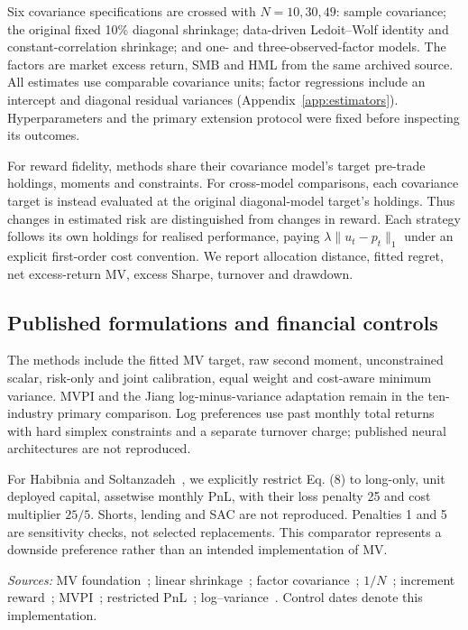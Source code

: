 \documentclass[sigconf,anonymous,review]{acmart}
\begin{document}
Six covariance specifications are crossed with $N=10,30,49$: sample covariance; the original fixed 10\% diagonal shrinkage; data-driven Ledoit--Wolf identity and constant-correlation shrinkage; and one- and three-observed-factor models. The factors are market excess return, SMB and HML from the same archived source. All estimates use comparable covariance units; factor regressions include an intercept and diagonal residual variances (Appendix~\ref{app:estimators}). Hyperparameters and the primary extension protocol were fixed before inspecting its outcomes.

For reward fidelity, methods share their covariance model's target pre-trade holdings, moments and constraints. For cross-model comparisons, each covariance target is instead evaluated at the original diagonal-model target's holdings. Thus changes in estimated risk are distinguished from changes in reward. Each strategy follows its own holdings for realised performance, paying $\lambda\|u_t-p_t\|_1$ under an explicit first-order cost convention. We report allocation distance, fitted regret, net excess-return MV, excess Sharpe, turnover and drawdown.

\subsection{Published formulations and financial controls}
The methods include the fitted MV target, raw second moment, unconstrained scalar, risk-only and joint calibration, equal weight and cost-aware minimum variance. MVPI and the Jiang log-minus-variance adaptation remain in the ten-industry primary comparison. Log preferences use past monthly total returns with hard simplex constraints and a separate turnover charge; published neural architectures are not reproduced.

For Habibnia and Soltanzadeh~\cite{habibnia2024}, we explicitly restrict Eq. (8) to long-only, unit deployed capital, assetwise monthly PnL, with their loss penalty 25 and cost multiplier $25/5$. Shorts, lending and SAC are not reproduced. Penalties 1 and 5 are sensitivity checks, not selected replacements. This comparator represents a downside preference rather than an intended implementation of MV.

\begin{table}[t]
\centering
\caption{Ten-industry comparison, 1990--2025. All distances and gaps here use the original fixed-diagonal MV reference at its common states. Covariance rows therefore measure a model change, not pure reward misalignment. Realised metrics use own-state paths. Published formulations are adapted, not complete algorithm replications; bold identifies our exact construction, not superior investment performance.}
\label{tab:historical}

\par\smallskip
\parbox{\textwidth}{\footnotesize\emph{Sources:} MV foundation~\cite{markowitz1952}; linear shrinkage~\cite{ledoit2004identity,ledoit2004correlation}; factor covariance~\cite{fan2008}; $1/N$~\cite{demiguel2009}; increment reward~\cite{kolm2019}; MVPI~\cite{zhang2021}; restricted PnL~\cite{habibnia2024}; log--variance~\cite{jiang2025}. Control dates denote this implementation.}
\end{table}
\end{document}
